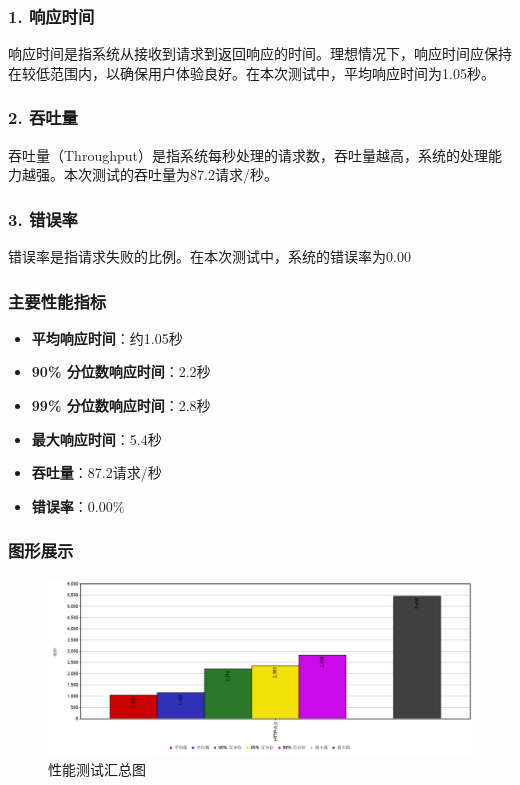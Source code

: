 \documentclass{article}
\begin{document}
\subsubsection*{1. 响应时间}
响应时间是指系统从接收到请求到返回响应的时间。理想情况下，响应时间应保持在较低范围内，以确保用户体验良好。在本次测试中，平均响应时间为1.05秒。

\subsubsection* {2. 吞吐量}
吞吐量（Throughput）是指系统每秒处理的请求数，吞吐量越高，系统的处理能力越强。本次测试的吞吐量为87.2请求/秒。

\subsubsection* {3. 错误率}
错误率是指请求失败的比例。在本次测试中，系统的错误率为0.00%

\subsubsection*{主要性能指标}
\begin{itemize}
    \item \textbf{平均响应时间}：约1.05秒
    \item \textbf{90\% 分位数响应时间}：2.2秒
    \item \textbf{99\% 分位数响应时间}：2.8秒
    \item \textbf{最大响应时间}：5.4秒
    \item \textbf{吞吐量}：87.2请求/秒
    \item \textbf{错误率}：0.00\%
\end{itemize}

\subsubsection*{图形展示}
\begin{figure}[H]
    \centering
    \includegraphics[width=1\textwidth]{result_image.png}
    \caption{性能测试汇总图}
\end{figure}
\end{document}
